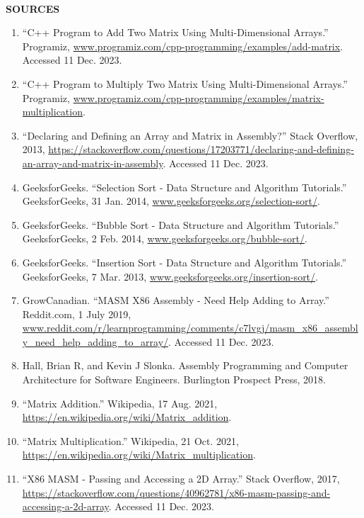 \documentclass[twoside]{article}
\begin{document}
\newpage
\noindent \\ \textbf{SOURCES}
\begin{enumerate}
\item “C++ Program to Add Two Matrix Using Multi-Dimensional Arrays.” Programiz, \url{www.programiz.com/cpp-programming/examples/add-matrix}. Accessed 11 Dec. 2023.
\item “C++ Program to Multiply Two Matrix Using Multi-Dimensional Arrays.” Programiz, \url{www.programiz.com/cpp-programming/examples/matrix-multiplication}.
\item “Declaring and Defining an Array and Matrix in Assembly?” Stack Overflow, 2013, \url{https://stackoverflow.com/questions/17203771/declaring-and-defining-an-array-and-matrix-in-assembly}. Accessed 11 Dec. 2023.
\item GeeksforGeeks. “Selection Sort - Data Structure and Algorithm Tutorials.” GeeksforGeeks, 31 Jan. 2014, \url{www.geeksforgeeks.org/selection-sort/}.
\item GeeksforGeeks. “Bubble Sort - Data Structure and Algorithm Tutorials.” GeeksforGeeks, 2 Feb. 2014, \url{www.geeksforgeeks.org/bubble-sort/}.
\item GeeksforGeeks. “Insertion Sort - Data Structure and Algorithm Tutorials.” GeeksforGeeks, 7 Mar. 2013, \url{www.geeksforgeeks.org/insertion-sort/}.
\item GrowCanadian. “MASM X86 Assembly - Need Help Adding to Array.” Reddit.com, 1 July 2019, \url{www.reddit.com/r/learnprogramming/comments/c7lvgj/masm_x86_assembly_need_help_adding_to_array/}. Accessed 11 Dec. 2023.
\item Hall, Brian R, and Kevin J Slonka. Assembly Programming and Computer Architecture for Software Engineers. Burlington Prospect Press, 2018.
\item “Matrix Addition.” Wikipedia, 17 Aug. 2021, \url{https://en.wikipedia.org/wiki/Matrix_addition}.
\item “Matrix Multiplication.” Wikipedia, 21 Oct. 2021, \url{https://en.wikipedia.org/wiki/Matrix_multiplication}.
\item “X86 MASM - Passing and Accessing a 2D Array.” Stack Overflow, 2017, \url{https://stackoverflow.com/questions/40962781/x86-masm-passing-and-accessing-a-2d-array}. Accessed 11 Dec. 2023.
\end{enumerate}
\end{document}
